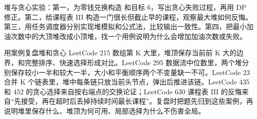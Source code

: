 \begin{labbox}
堆与贪心实验：第一，为零钱兑换构造  和目标 6，写出贪心失败过程，再用 DP 修正。第二，给课程表 III 构造一门很长但截止早的课程，观察最大堆如何反悔。第三，用任务调度器分别实现堆模拟和公式法，比较输出一致性。第四，把最小加油次数中的大顶堆改成小顶堆，找一个用例说明为什么会增加加油次数或失败。
\end{labbox}

\begin{principlebox}{用案例复盘堆和贪心}
LeetCode 215 数组第 K 大里，堆顶保存当前前 K 大的边界，和完整排序、快速选择形成对比。LeetCode 295 数据流中位数里，两个堆分别保存较小一半和较大一半，大小和平衡顺序两个不变量缺一不可。LeetCode 23 合并 K 个链表里，堆中每条链只放当前头节点，弹出后推进该链。LeetCode 435 和 452 的贪心选择来自按右端点的交换论证；LeetCode 630 课程表 III 的反悔来自“先接受，再在超时后丢掉持续时间最长课程”。复盘时把题先归到这些案例，再说明堆里保存什么、堆顶为何可用、局部选择为什么不伤害全局。
\end{principlebox}





